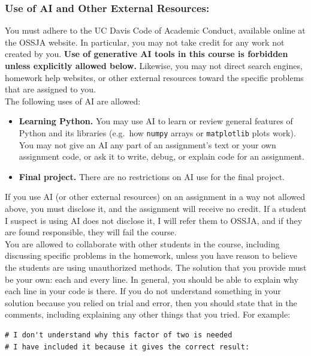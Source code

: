 \documentclass[12pt]{article}
\begin{document}
\subsubsection*{Use of AI and Other External Resources:}

You must adhere to the UC Davis Code of Academic Conduct, available
online at the OSSJA website. In particular, you may not take credit for
any work not created by you.  {\bf Use of generative AI tools in this
  course is forbidden unless explicitly allowed below.}  Likewise, you
may not direct search engines, homework help websites, or other
external resources toward the specific problems that are assigned to
you.\\[3pt]

\noindent
The following uses of AI are allowed:
\begin{itemize}[itemsep=0pt]
\item {\bf Learning Python.} You may use AI to learn or review general
  features of Python and its libraries (e.g.\ how \texttt{numpy}
  arrays or \texttt{matplotlib} plots work).  You may not give an AI
  any part of an assignment's text or your own assignment code, or ask
  it to write, debug, or explain code for an assignment.
\item {\bf Final project.} There are no restrictions on AI use for the
  final project.
\end{itemize}
If you use AI (or other external resources) on an assignment in a way
not allowed above, you must disclose it, and the assignment will
receive no credit.  If a student I suspect is using AI does not
disclose it, I will refer them to OSSJA, and if they are found
responsible, they will fail the course.\\[3pt]

\noindent
You are allowed to collaborate with other students in the course,
including discussing specific problems in the homework, unless you
have reason to believe the students are using unauthorized methods.
The solution that you provide must be your own: each and every line.
In general, you should be able to explain why each line in your code
is there.  If you do not understand something in your solution because
you relied on trial and error, then you should state that in the
comments, including explaining any other things that you tried.  For
example:
\begin{verbatim}
# I don't understand why this factor of two is needed
# I have included it because it gives the correct result:
\end{verbatim}
\end{document}

